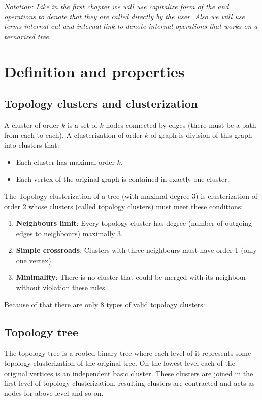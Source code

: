 {\it Notation: Like in the first chapter we will use capitalize form of the
\Cut{} and \Link{} operations to denote that they are called directly by the
user. Also we will use terms {\sl internal cut} and {\sl internal link} to
denote internal operations that works on a ternarized tree.}

\section{Definition and properties}

\subsection{Topology clusters and clusterization}

A {\I cluster of order $k$} is a set of $k$ nodes connected by edges (there must
be a path from each to each). A {\I clusterization of order $k$} of graph is
division of this graph into clusters that:
\begin{itemize}
\item Each cluster has maximal order $k$.
\item Each vertex of the original graph is contained in exactly one cluster.
\end{itemize}

The {\I Topology clusterization} of a tree (with maximal degree 3) is clusterization
of order 2 whose clusters (called {\I topology clusters}) must meet these conditions:
\begin{enumerate}
\item {\bf Neighbours limit}: Every topology cluster has degree (number of
outgoing edges to neighbours) maximally 3.
\item {\bf Simple crossroads}: Clusters with three neighbours must have order 1 (only one vertex).
\item {\bf Minimality}: There is no cluster that could be merged with its neighbour
without violation these rules.
\end{enumerate}

Because of that there are only 8 types of valid topology clusters:


\subsection{Topology tree}

The {\I topology tree} is a rooted binary tree where each
level of it represents some topology clusterization of the original tree. On the
lowest level each of the original vertices is an independent basic cluster.
These clusters are joined in the first level of topology clusterization,
resulting clusters are contracted and acts as nodes for above level and so on.

